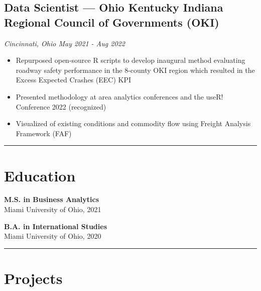 \documentclass[
  11pt,
]{article}
\providecommand{\tightlist}{%
  \setlength{\itemsep}{0pt}\setlength{\parskip}{0pt}}\usepackage{longtable,booktabs,array}
\begin{document}
\hypertarget{data-scientist-ohio-kentucky-indiana-regional-council-of-governments-oki}{%
\subsection{Data Scientist --- Ohio Kentucky Indiana Regional Council of
Governments
(OKI)}\label{data-scientist-ohio-kentucky-indiana-regional-council-of-governments-oki}}

\emph{Cincinnati, Ohio \textbar{} May 2021 - Aug 2022}

\begin{itemize}
\tightlist
\item
  Repurposed open-source R scripts to develop inaugural method
  evaluating roadway safety performance in the 8-county OKI region which
  resulted in the Excess Expected Crashes (EEC) KPI
\item
  Presented methodology at area analytics conferences and the useR!
  Conference 2022 (recognized)
\item
  Visualized of existing conditions and commodity flow using Freight
  Analysis Framework (FAF)
\end{itemize}

\begin{center}\rule{0.5\linewidth}{0.5pt}\end{center}

\hypertarget{education}{%
\section{Education}\label{education}}

\textbf{M.S. in Business Analytics}\\
Miami University of Ohio, 2021

\textbf{B.A. in International Studies}\\
Miami University of Ohio, 2020

\begin{center}\rule{0.5\linewidth}{0.5pt}\end{center}

\hypertarget{projects}{%
\section{Projects}\label{projects}}
\end{document}
